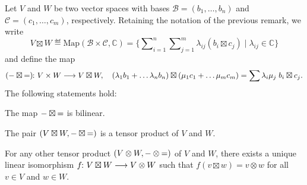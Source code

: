 \documentclass[a4paper, oneside, 12pt]{amsart}
\begin{document}
\begin{theorem}\label{thm:tensor-product-existence-and-uniqueness}
  Let \( V \) and \( W \) be two vector spaces with bases \( \mathcal{B} = (b_1, \dots, b_n) \) and \( \mathcal{C} = (c_1, \dots, c_m) \), respectively.
  Retaining the notation of the previous remark, we write
  \begin{equation*}
    V\boxtimes W \eqdef \mathrm{Map}(\mathcal{B}\times \mathcal{C}, \mathbb{C}) = \big\{ \sum\nolimits_{i=1}^{n}\sum\nolimits_{j=1}^{m}\lambda_{ij}(b_{i}\boxtimes c_{j})\mid \lambda_{ij} \in \mathbb{C}\big\}
  \end{equation*}
  and define the map
  \begin{equation*}
    (\blank \boxtimes \bblank )\from V\times W \to V \boxtimes W, \quad  (\lambda_{1} b_{1} + \dots \lambda_{n} b_{n})\boxtimes (\mu_{1}c_{1}+ \dots \mu_{m}c_{m}) = \sum \lambda_{i}\mu_{j}\; b_{i}\boxtimes c_{j}.
  \end{equation*}
  The following statements hold:
  \begin{thmlist}
    \item The map \( {-} \boxtimes {=} \) is bilinear.
    \item The pair \( (V \boxtimes W, {-} \boxtimes {=}) \) is a tensor product of \( V \) and \( W \).
    \item For any other tensor product \( (V \otimes W, {-} \otimes {=}) \) of \( V \) and \( W \), there exists a unique linear isomorphism \( f \from V \boxtimes W \to V \otimes W \) such that \( f(v \boxtimes w) = v \otimes w \) for all \( v \in V \) and \( w \in W \).
  \end{thmlist}
\end{theorem}
\end{document}
